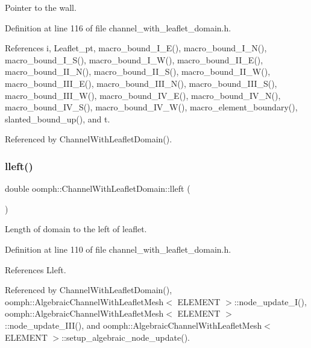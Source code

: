 Pointer to the wall. 



Definition at line 116 of file channel\+\_\+with\+\_\+leaflet\+\_\+domain.\+h.



References i, Leaflet\+\_\+pt, macro\+\_\+bound\+\_\+\+I\+\_\+\+E(), macro\+\_\+bound\+\_\+\+I\+\_\+\+N(), macro\+\_\+bound\+\_\+\+I\+\_\+\+S(), macro\+\_\+bound\+\_\+\+I\+\_\+\+W(), macro\+\_\+bound\+\_\+\+I\+I\+\_\+\+E(), macro\+\_\+bound\+\_\+\+I\+I\+\_\+\+N(), macro\+\_\+bound\+\_\+\+I\+I\+\_\+\+S(), macro\+\_\+bound\+\_\+\+I\+I\+\_\+\+W(), macro\+\_\+bound\+\_\+\+I\+I\+I\+\_\+\+E(), macro\+\_\+bound\+\_\+\+I\+I\+I\+\_\+\+N(), macro\+\_\+bound\+\_\+\+I\+I\+I\+\_\+\+S(), macro\+\_\+bound\+\_\+\+I\+I\+I\+\_\+\+W(), macro\+\_\+bound\+\_\+\+I\+V\+\_\+\+E(), macro\+\_\+bound\+\_\+\+I\+V\+\_\+\+N(), macro\+\_\+bound\+\_\+\+I\+V\+\_\+\+S(), macro\+\_\+bound\+\_\+\+I\+V\+\_\+\+W(), macro\+\_\+element\+\_\+boundary(), slanted\+\_\+bound\+\_\+up(), and t.



Referenced by Channel\+With\+Leaflet\+Domain().

\mbox{\label{classoomph_1_1ChannelWithLeafletDomain_a5538092062970dbd2f02218a05639d49}} 
\subsubsection{\texorpdfstring{lleft()}{lleft()}}
{\footnotesize\ttfamily double oomph\+::\+Channel\+With\+Leaflet\+Domain\+::lleft (\begin{DoxyParamCaption}{ }\end{DoxyParamCaption})\hspace{0.3cm}{\ttfamily [inline]}}



Length of domain to the left of leaflet. 



Definition at line 110 of file channel\+\_\+with\+\_\+leaflet\+\_\+domain.\+h.



References Lleft.



Referenced by Channel\+With\+Leaflet\+Domain(), oomph\+::\+Algebraic\+Channel\+With\+Leaflet\+Mesh$<$ E\+L\+E\+M\+E\+N\+T $>$\+::node\+\_\+update\+\_\+\+I(), oomph\+::\+Algebraic\+Channel\+With\+Leaflet\+Mesh$<$ E\+L\+E\+M\+E\+N\+T $>$\+::node\+\_\+update\+\_\+\+I\+I\+I(), and oomph\+::\+Algebraic\+Channel\+With\+Leaflet\+Mesh$<$ E\+L\+E\+M\+E\+N\+T $>$\+::setup\+\_\+algebraic\+\_\+node\+\_\+update().

